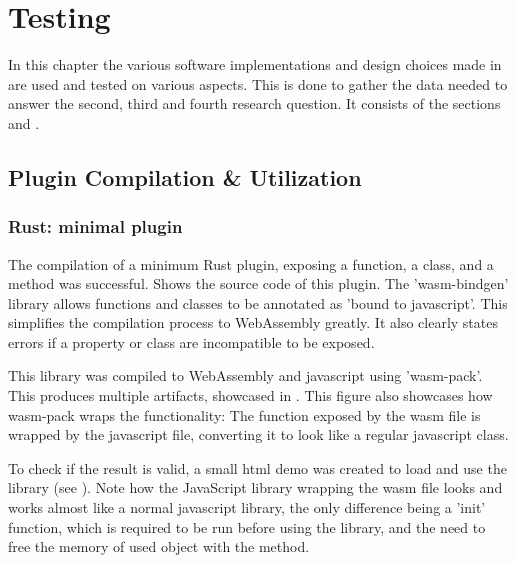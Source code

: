 \chapter{Testing}%
\label{chap:testing}

In this chapter the various software implementations and design choices made in  are used and tested on various aspects. 
This is done to gather the data needed to answer the second, third and fourth research question. 
It consists of the sections  and .


\section{Plugin Compilation \& Utilization}
\label{sec:testing:compilation}

\subsection{Rust: minimal plugin}
The compilation of a minimum Rust plugin, exposing a function, a class, and a method was successful. 
 Shows the source code of this plugin. 
The 'wasm-bindgen' library allows functions and classes to be annotated as 'bound to javascript'. 
This simplifies the compilation process to WebAssembly greatly. 
It also clearly states errors if a property or class are incompatible to be exposed. 

This library was compiled to WebAssembly and javascript using 'wasm-pack'. 
This produces multiple artifacts, showcased in . 
This figure also showcases how wasm-pack wraps the functionality: 
The  function exposed by the wasm file is wrapped by the javascript file, converting it to look like a regular javascript class.

To check if the result is valid, a small html demo was created to load and use the library (see ).
Note how the JavaScript library wrapping the wasm file looks and works almost like a normal javascript library, the only difference being a 'init' function, which is required to be run before using the library, and the need to free the memory of used object with the  method.



